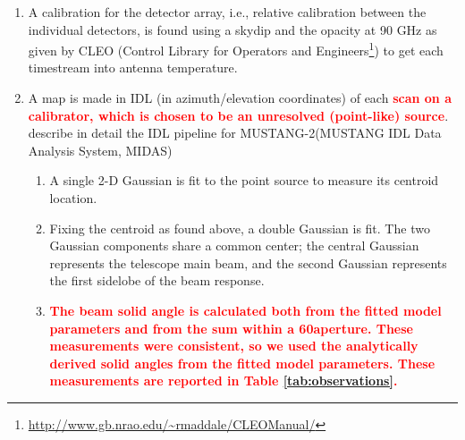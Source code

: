 \documentclass[twocolumn]{aastex62}
\def\edit#1{{\textcolor{red}{\textbf{#1}}}}
\def\change#1{{\textcolor{red}{\textbf{#1}}}}
\newcommand{\MUSTANG}{MUSTANG-2\xspace}
\begin{document}
\begin{enumerate}
    \item A calibration for the detector array, i.e., relative calibration between
        the individual detectors, is found using a skydip and the
        opacity at 90 GHz as given by CLEO (Control Library for Operators and
        Engineers\footnote{\url{http://www.gb.nrao.edu/~rmaddale/CLEOManual/}}) to get
        each timestream into
        antenna temperature.
    \item A map is made in IDL (in azimuth/elevation coordinates) of each
        \change{scan on a calibrator, which is chosen to be an unresolved
        (point-like) source}.  \cite{Romero2020a} describe in detail the
        IDL pipeline for \MUSTANG (MUSTANG IDL Data Analysis System, MIDAS)
        \begin{enumerate}
            \item A single 2-D Gaussian is fit to the point source to
                measure its centroid location.
            \item Fixing the centroid as found above, a double Gaussian is fit.
                The two Gaussian components share a common center; the
                central Gaussian represents the telescope main beam, and the
                second Gaussian represents the first sidelobe of the beam
                response.
            \item \edit{The beam solid angle is calculated both from the fitted
                model parameters and from the sum within a 60\arcsec aperture.
                These measurements were consistent, so we used the analytically
                derived solid angles from the fitted model parameters.
                These measurements are reported in Table \ref{tab:observations}.
                }

\end{enumerate}
\end{enumerate}
\end{document}
